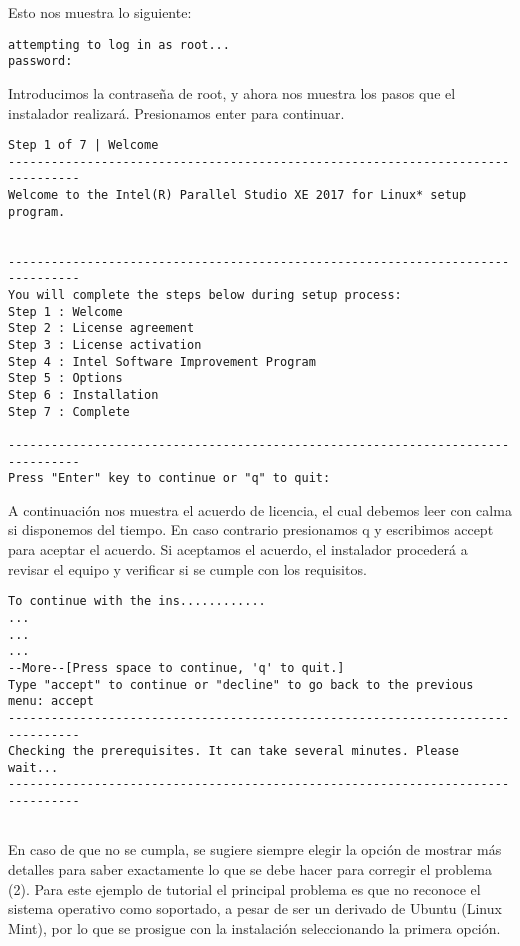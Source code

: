 Esto nos muestra lo siguiente:

\begin{lstlisting}
attempting to log in as root...
password:
\end{lstlisting}

Introducimos la contraseña de root, y ahora nos muestra los pasos que el instalador realizará. Presionamos enter para continuar.

\begin{lstlisting}
Step 1 of 7 | Welcome
--------------------------------------------------------------------------------
Welcome to the Intel(R) Parallel Studio XE 2017 for Linux* setup program.


--------------------------------------------------------------------------------
You will complete the steps below during setup process:
Step 1 : Welcome
Step 2 : License agreement
Step 3 : License activation
Step 4 : Intel Software Improvement Program
Step 5 : Options
Step 6 : Installation
Step 7 : Complete

--------------------------------------------------------------------------------
Press "Enter" key to continue or "q" to quit: 
\end{lstlisting}

A continuación nos muestra el acuerdo de licencia, el cual debemos leer con calma si disponemos del tiempo. En caso contrario presionamos q y escribimos accept para aceptar el acuerdo. Si aceptamos el acuerdo, el instalador procederá a revisar el equipo y verificar si se cumple con los requisitos.

\begin{lstlisting}
To continue with the ins............
...
...
...
--More--[Press space to continue, 'q' to quit.]
Type "accept" to continue or "decline" to go back to the previous menu: accept
--------------------------------------------------------------------------------
Checking the prerequisites. It can take several minutes. Please wait...
--------------------------------------------------------------------------------


\end{lstlisting}

En caso de que no se cumpla, se sugiere siempre elegir la opción de mostrar más detalles para saber exactamente lo que se debe hacer para corregir el problema (2). Para este ejemplo de tutorial el principal problema es que no reconoce el sistema operativo como soportado, a pesar de ser un derivado de Ubuntu (Linux Mint), por lo que se prosigue con la instalación seleccionando la primera opción.

